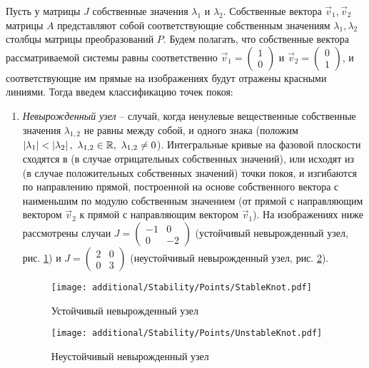	Пусть у матрицы $J$ собственные значения $\lambda_1$ и $\lambda_2$. Собственные вектора $\vec{v}_1, \vec{v}_2$ матрицы $A$ представляют собой соответствующие собственным значениям $\lambda_1, \lambda_2$ столбцы матрицы преобразований $P$. Будем полагать, что собственные вектора рассматриваемой системы равны соответственно $\vec{v}_1 = \begin{pmatrix} 1 \\ 0 \end{pmatrix}$ и $\vec{v}_2 = \begin{pmatrix} 0 \\ 1 \end{pmatrix}$, и соответствующие им прямые на изображениях будут отражены красными линиями. Тогда введем классификацию точек покоя:
	\begin{enumerate}
		\item \textit{Невырожденный узел} -- случай, когда ненулевые вещественные собственные значения $\lambda_{1, 2}$ не равны между собой, и одного знака (положим $\left\vert \lambda_1 \right\vert < \left\vert \lambda_2 \right\vert, ~ \lambda_{1, 2} \in \mathbb{R}, ~ \lambda_{1, 2} \neq 0$). Интегральные кривые на фазовой плоскости сходятся в (в случае отрицательных собственных значений), или исходят из (в случае положительных собственных значений) точки покоя, и изгибаются по направлению прямой, построенной на основе собственного вектора с наименьшим по модулю собственным значением (от прямой с направляющим вектором $\vec{v}_2$ к прямой с направляющим вектором $\vec{v}_1$). На изображениях ниже рассмотрены случаи $J = \begin{pmatrix} -1 & 0 \\ 0 & -2 \end{pmatrix}$ (устойчивый невырожденный узел, рис. \ref{Stability:StableKnot}) и $J = \begin{pmatrix} 2 & 0 \\ 0 & 3 \end{pmatrix}$ (неустойчивый невырожденный узел, рис. \ref{Stability:UnstableKnot}).

			\begin{multicols}{2}

				\begin{figure}[H]
					\centering
					\texttt{[image: additional/Stability/Points/StableKnot.pdf]}
					\caption{Устойчивый невырожденный узел}
					\label{Stability:StableKnot}
				\end{figure}

			\columnbreak

				\begin{figure}[H]
					\centering
					\texttt{[image: additional/Stability/Points/UnstableKnot.pdf]}
					\caption{Неустойчивый невырожденный узел}
					\label{Stability:UnstableKnot}
				\end{figure}


\end{multicols}
\end{enumerate}
